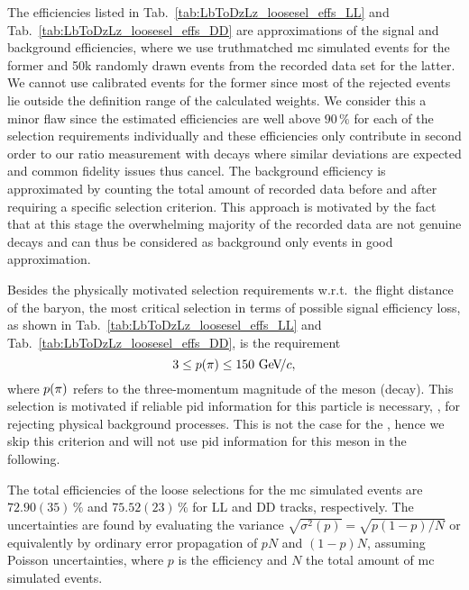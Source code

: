 The efficiencies listed in Tab.~\ref{tab:LbToDzLz_loosesel_effs_LL} and Tab.~\ref{tab:LbToDzLz_loosesel_effs_DD} are approximations of the signal and background efficiencies, where we use \gls{truthmatched} \gls{mc} simulated events for the former and 50k randomly drawn events from the recorded data set for the latter.
We cannot use calibrated events for the former since most of the rejected events lie outside the definition range of the calculated weights.
We consider this a minor flaw since the estimated efficiencies are well above $90\,\%$ for each of the selection requirements individually and these efficiencies only contribute in second order to our ratio measurement with \decay{\Lb}{\Dz\proton\pim} decays where similar deviations are expected and common fidelity issues thus cancel.
The background efficiency is approximated by counting the total amount of recorded data before and after requiring a specific selection criterion.
This approach is motivated by the fact that at this stage the overwhelming majority of the recorded data are not genuine \decay{\Lb}{\Dz\Lz} decays and can thus be considered as background only events in good approximation.

Besides the physically motivated selection requirements w.r.t.\ the flight distance of the \Lz baryon, the most critical selection in terms of possible signal efficiency loss, as shown in Tab.~\ref{tab:LbToDzLz_loosesel_effs_LL} and Tab.~\ref{tab:LbToDzLz_loosesel_effs_DD}, is the requirement
\begin{equation*}
    3 \le p({\pi}) \le 150\,{\mathrm{\,Ge\kern -0.1em V\!/}c},
\end{equation*}
where $p({\pi})$ refers to the three-momentum magnitude of the \pim meson (\Lz decay).
This selection is motivated if reliable \gls{pid} information for this particle is necessary, \eg{}, for rejecting physical background processes.
This is not the case for the \decay{\Lz}{\proton\pim}, hence we skip this criterion and will not use \gls{pid} information for this meson in the following.

The total efficiencies of the loose selections for the \gls{mc} simulated events are $72.90(35)\,\%$ and $75.52(23)\,\%$ for \gls{LL} and \gls{DD} tracks, respectively.
The uncertainties are found by evaluating the variance $\sqrt{\sigma^2(p)} = \sqrt{p(1-p)/N}$ or equivalently by ordinary error propagation of $pN$ and $(1-p)N$, assuming Poisson uncertainties, where $p$ is the efficiency and $N$ the total amount of \gls{mc} simulated events.

